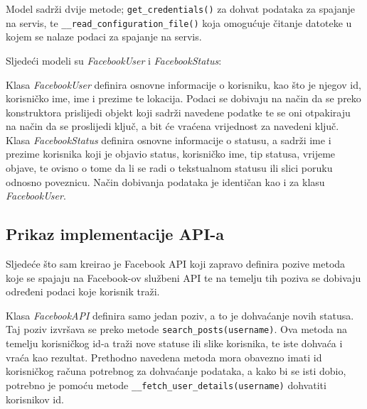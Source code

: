 \documentclass[a4paper,12pt]{foi}
\begin{document}
\lstset{commentstyle=\textit,language=python}


Model sadrži dvije metode; \texttt{get\_credentials()} za dohvat podataka za spajanje na servis, te \texttt{\_\_read\_configuration\_file()} koja omogućuje čitanje datoteke u kojem se nalaze podaci za spajanje na servis.

Sljedeći modeli su \textit{FacebookUser} i \textit{FacebookStatus}:

\lstset{commentstyle=\textit,language=python}


Klasa \textit{FacebookUser} definira osnovne informacije o korisniku, kao što je njegov id, korisničko ime, ime i prezime te lokacija. Podaci se dobivaju na način da se preko konstruktora prislijedi objekt koji sadrži navedene podatke te se oni otpakiraju na način da se proslijedi ključ, a bit će vraćena vrijednost za navedeni ključ. Klasa \textit{FacebookStatus} definira osnovne informacije o statusu, a sadrži ime i prezime korisnika koji je objavio status, korisničko ime, tip statusa, vrijeme objave, te ovisno o tome da li se radi o tekstualnom statusu ili slici poruku odnosno poveznicu. Način dobivanja podataka je identičan kao i za klasu \textit{FacebookUser}.

\subsection{Prikaz implementacije API-a}

Sljedeće što sam kreirao je Facebook API koji zapravo definira pozive metoda koje se spajaju na Facebook-ov službeni API te na temelju tih poziva se dobivaju određeni podaci koje korisnik traži.

\lstset{commentstyle=\textit,language=python}


Klasa \textit{FacebookAPI} definira samo jedan poziv, a to je dohvaćanje novih statusa. Taj poziv izvršava se preko metode \texttt{search\_posts(username)}. Ova metoda na temelju korisničkog id-a traži nove statuse ili slike korisnika, te iste dohvaća i vraća kao rezultat. Prethodno navedena metoda mora obavezno imati id korisničkog računa potrebnog za dohvaćanje podataka, a kako bi se isti dobio, potrebno je pomoću metode \texttt{\_\_fetch\_user\_details(username)} dohvatiti korisnikov id.
\end{document}
